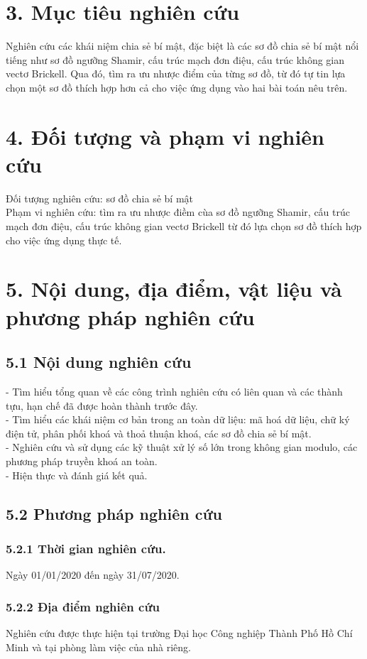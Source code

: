 \documentclass[12pt,a4paper]{report}
\begin{document}
\section*{3. Mục tiêu nghiên cứu}
Nghiên cứu các khái niệm chia sẻ bí mật, đặc biệt là các sơ đồ chia sẻ bí mật nổi tiếng như sơ đồ ngưỡng Shamir, cấu trúc mạch đơn điệu, cấu trúc không gian vectơ Brickell. Qua đó, tìm ra ưu nhược điểm của từng sơ đồ, từ đó tự tin lựa chọn một sơ đồ thích hợp hơn cả cho việc ứng dụng vào hai bài toán nêu trên.
\section*{4. Đối tượng và phạm vi nghiên cứu}
Đối tượng nghiên cứu: sơ đồ chia sẻ bí mật
\\Phạm vi nghiên cứu: tìm ra ưu nhược điềm cùa sơ đồ ngưỡng Shamir, cấu trúc mạch đơn điệu, cấu trúc không gian vectơ Brickell từ đó lựa chọn sơ đồ thích hợp cho việc ứng dụng thực tế.
\section*{5. Nội dung, địa điểm, vật liệu và phương pháp nghiên cứu}
	\subsection*{5.1 Nội dung nghiên cứu}
- Tìm hiểu tổng quan về các công trình nghiên cứu có liên quan và các thành tựu, hạn chế đã được hoàn thành trước đây.
\\- Tìm hiểu các khái niệm cơ bản trong an toàn dữ liệu: mã hoá dữ liệu, chữ ký điện tử, phân phối khoá và thoả thuận khoá, các sơ đồ chia sẻ bí mật. 
\\- Nghiên cứu và sử dụng các kỹ thuật xử lý số lớn trong không gian modulo, các phương pháp truyền khoá an toàn. 
\\- Hiện thực và đánh giá kết quả.

	\subsection*{5.2 Phương pháp nghiên cứu}
		\subsubsection*{5.2.1 Thời gian nghiên cứu.}
	Ngày 01/01/2020 đến ngày 31/07/2020.
		\subsubsection*{5.2.2 Địa  điểm nghiên cứu}
	Nghiên cứu được thực hiện tại trường Đại học Công nghiệp Thành Phố Hồ Chí Minh và tại phòng làm việc của nhà riêng.
\end{document}

